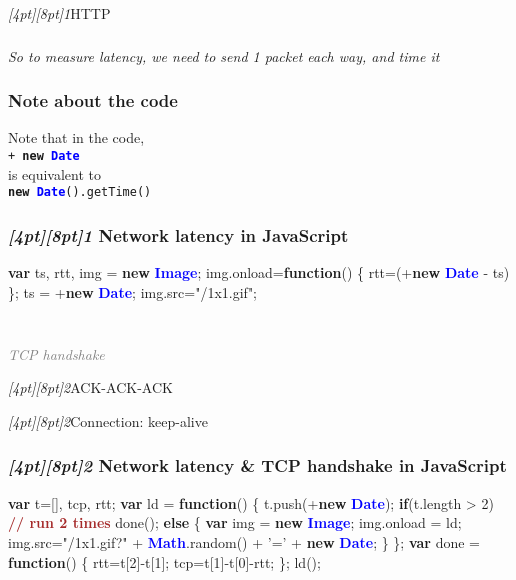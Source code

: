 \documentclass{beamer}
\newcommand{\sn}[1]{\textrm{\textit{\Huge{\raisebox{-3pt}[4pt][8pt]{\textcolor{f2elblue}{#1}}}}}\hspace{4pt}}
\newcommand{\innersplash}[1]{
  \begin{center}
    \large \textrm{\textit{ #1 } }
  \end{center}
}
\newcommand{\splashslide}[2][{}]{
  \begin{frame}
  \frametitle{#1}
  \innersplash{#2}
  \end{frame}
}
\newcommand{\leadinslide}[2]{
  \splashslide{
     {\fontsize{150}{20}\selectfont{\raisebox{0pt}[90pt][0pt]{\textcolor{light-gray}{#1}}}} \\ \huge \textcolor{gray}{#2}
  }
}
\def\brown<#1>#2{\textcolor<#1>{brown}{\textbf<#1>{#2}}}
\def\green<#1>#2{\textcolor<#1>{dark-green}{\textbf<#1>{#2}}}
\def\blue<#1>#2{\textcolor<#1>{blue}{\textbf<#1>{#2}}}
\begin{document}
\begin{frame}{\sn{1}HTTP}
\end{frame}

\splashslide{So to measure latency, we need to send 1 packet each way, and time it}

\begin{frame}[fragile]
\frametitle{Note about the code}
\begin{center}
Note that in the code, \\ \texttt{+ \green<1>{new} \blue<1>{Date}} \\ is equivalent to \\ \texttt{\green<1>{new} \blue<1>{Date}().getTime()}
\end{center}
\end{frame}

\begin{frame}[fragile]
\frametitle{\sn{1} Network latency in JavaScript}
\begin{semiverbatim}
  \green<1>{var} ts, rtt, img = \green<1>{new} \blue<1>{Image};
  img.onload=\green<1>{function}() \{ rtt=(+\green<1>{new} \blue<1>{Date} - ts) \};
  ts = +\green<1>{new} \blue<1>{Date};
  img.src="/1x1.gif";
\end{semiverbatim}
\end{frame}

\leadinslide{2}{TCP handshake}

\begin{frame}{\sn{2}ACK-ACK-ACK}
\end{frame}

\begin{frame}{\sn{2}Connection: keep-alive}
\end{frame}

\begin{frame}[fragile]
\frametitle{\sn{2} Network latency \& TCP handshake in JavaScript}
\vspace{-.3cm}
\begin{semiverbatim}
\green<1>{var} t=[], tcp, rtt;
\green<1>{var} ld = \green<1>{function}() \{
   t.push(+\green<1>{new} \blue<1>{Date});
   \green<1>{if}(t.length > 2)  \brown<1>{// run 2 times}
     done();
   \green<1>{else} \{
     \green<1>{var} img = \green<1>{new} \blue<1>{Image};
     img.onload = ld;
     img.src="/1x1.gif?" + \blue<1>{Math}.random()
                         + '=' + \green<1>{new} \blue<1>{Date};
   \}
\};
\green<1>{var} done = \green<1>{function}() \{
  rtt=t[2]-t[1];
  tcp=t[1]-t[0]-rtt;
\};
ld();
\end{semiverbatim}
\end{frame}
\end{document}
